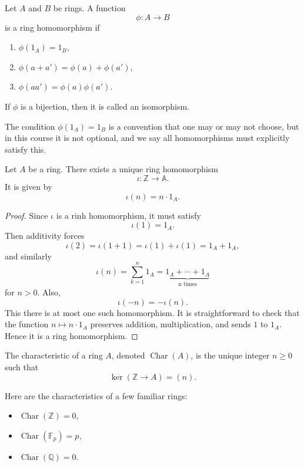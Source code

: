 \documentclass[11pt]{article}
\begin{document}
\begin{defn}
    Let $A$ and $B$ be rings. A function 
    \[
        \phi : A \to B
    \]
    is a ring homomorphism if 
    \begin{enumerate}
        \item $\phi(1_A) = 1_B$, 
        \item $\phi(a + a') = \phi(a) + \phi(a')$, 
        \item $\phi(aa') = \phi(a) \phi(a')$. 
    \end{enumerate}
    If $\phi$ is a bijection, then it is 
    called an isomorphism. 
\end{defn}
The condition $\phi(1_A) = 1_B$ is a convention that 
one may or may not choose, but in this course it is 
not optional, and we say all homomorphisms must explicitly 
satisfy this. 

\begin{prop}
    Let $A$ be a ring. There exists a unique ring homomorphism 
    \[
        \iota : \mathbb Z \to \mathbb A.
    \]
    It is given by 
    \[
        \iota(n) = n \cdot 1_A.
    \]
\end{prop}
\begin{proof}
    Since $\iota$ is a rinh homomorphism, it must satisfy 
    \[
        \iota(1) = 1_A. 
    \]
    Then additivity forces 
    \[
        \iota(2) = \iota(1+1) = \iota(1) + \iota(1) 
        = 1_A + 1_A, 
    \]
    and similarly 
    \[
        \iota(n) = \sum_{k=1}^n 1_A = 
        \underbrace{1_A + \cdots + 1_A}_{\text{n times}} 
    \]
    for $n > 0$. Also, 
    \[
        \iota(-n) = -\iota(n).
    \]
    This there is at most one such homomorphism. 
    It is straightforward to check that the function 
    $n \mapsto n \cdot 1_A$ preserves addition, multiplication, 
    and sends $1$ to $1_A$. Hence it is a ring homomorphism. 
\end{proof}

\begin{defn}[Characteristic]
    The characteristic of a ring $A$, denoted 
    $\operatorname{Char}(A)$,
    is the unique integer $n \geq 0$ such that 
    \[
        \ker(\mathbb Z \to A) = (n). 
    \]
\end{defn}
\begin{ex}
    Here are the characteristics of a few familiar 
    rings: 
    \begin{itemize}
        \item $\operatorname{Char}(\mathbb Z) = 0$,  
        \item $\operatorname{Char}(\mathbb F_p) = p$, 
        \item $\operatorname{Char}(\mathbb Q) = 0$. 
    \end{itemize}
\end{ex}
\end{document}
